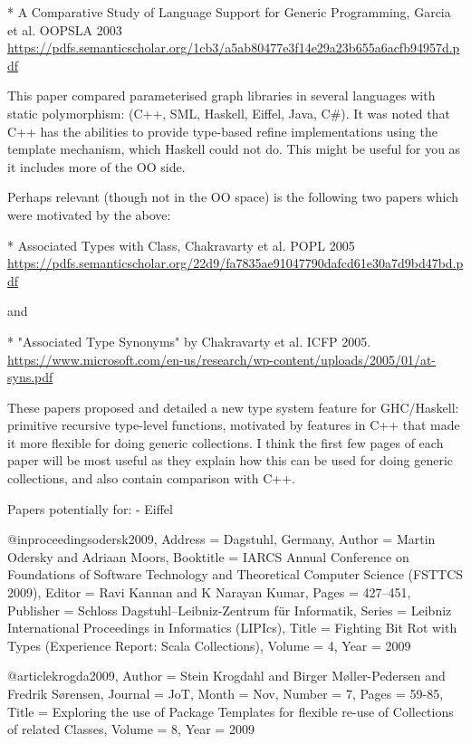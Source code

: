 \documentclass[sigconf, 10pt, review]{acmart}
\begin{document}
\begin{note}
* A Comparative Study of Language Support for Generic Programming, Garcia et al. OOPSLA 2003
\url{https://pdfs.semanticscholar.org/1cb3/a5ab80477e3f14e29a23b655a6acfb94957d.pdf}

This paper compared parameterised graph libraries in several languages with static polymorphism: (C++, SML, Haskell, Eiffel, Java, C\#). It was noted that C++ has the abilities to provide type-based refine implementations using the template mechanism, which Haskell could not do. This might be useful for you as it includes more of the OO side.

Perhaps relevant (though not in the OO space) is the following two papers which were motivated by the above:

* Associated Types with Class, Chakravarty et al. POPL 2005
\url{https://pdfs.semanticscholar.org/22d9/fa7835ae91047790dafcd61e30a7d9bd47bd.pdf}

and

* "Associated Type Synonyms" by Chakravarty et al. ICFP 2005.
\url{https://www.microsoft.com/en-us/research/wp-content/uploads/2005/01/at-syns.pdf}

These papers proposed and detailed a new type system feature for GHC/Haskell: primitive recursive type-level functions, motivated by features in C++ that made it more flexible for doing generic collections. I think the first few pages of each paper will be most useful as they explain how this can be used for doing generic collections, and also contain comparison with C++.

Papers potentially for:
 - Eiffel

@inproceedings{odersk2009,
	Address = {Dagstuhl, Germany},
	Author = {Martin Odersky and Adriaan Moors},
	Booktitle = {IARCS Annual Conference on Foundations of Software Technology and Theoretical Computer Science (FSTTCS 2009)},
	Editor = {Ravi Kannan and K Narayan Kumar},
	Pages = {427--451},
	Publisher = {Schloss Dagstuhl--Leibniz-Zentrum {f\"{u}r} Informatik},
	Series = {Leibniz International Proceedings in Informatics (LIPIcs)},
	Title = {Fighting Bit Rot with Types (Experience Report: Scala Collections)},
	Volume = {4},
	Year = {2009}}

@article{krogda2009,
	Author = {Stein Krogdahl and Birger M{\o}ller-Pedersen and Fredrik S{\o}rensen},
	Journal = {JoT},
	Month = {Nov},
	Number = {7},
	Pages = {59-85},
	Title = {Exploring the use of Package Templates for flexible re-use of Collections of related Classes},
	Volume = {8},
	Year = {2009}}
  

\end{note}
\end{document}
